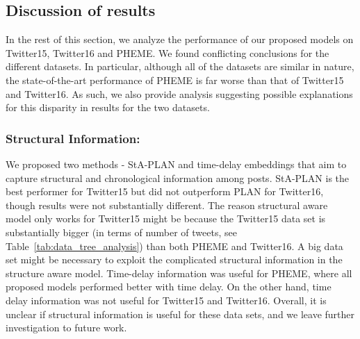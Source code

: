 \documentclass[letterpaper]{article} %
\begin{document}
\subsection{Discussion of results} \label{Results Analysis}
In the rest of this section, we analyze the performance of our proposed models on Twitter15, Twitter16 and PHEME. We found conflicting conclusions for the different datasets. In particular, although all of the datasets are similar in nature, the state-of-the-art performance of PHEME is far worse than that of Twitter15 and Twitter16. As such, we also provide analysis suggesting possible explanations for this disparity in results for the two datasets.

\subsubsection{Structural Information:}
We proposed two methods - StA-PLAN and time-delay embeddings that aim to capture structural and chronological information among posts. StA-PLAN is the best performer for Twitter15 but did not outperform PLAN for Twitter16, though results were not substantially different. The reason structural aware model only works for Twitter15 might be because the Twitter15 data set is substantially bigger (in terms of number of tweets, see Table~\ref{tab:data_tree_analysis}) than both PHEME and Twitter16. A big data set might be necessary to exploit the complicated structural information in the structure aware model. Time-delay information was useful for PHEME, where all proposed models performed better with time delay. On the other hand, time delay information was not useful for Twitter15 and Twitter16. Overall, it is unclear if structural information is useful for these data sets, and we leave further investigation to future work.
\end{document}
